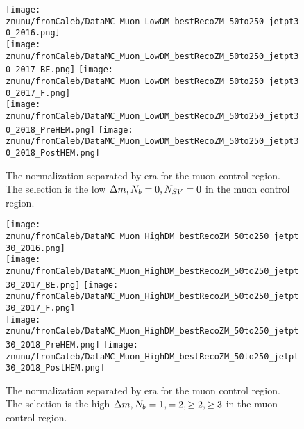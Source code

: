 \begin{figure}[!h]
	\begin{center}
    \texttt{[image: znunu/fromCaleb/DataMC\_Muon\_LowDM\_bestRecoZM\_50to250\_jetpt30\_2016.png]} \\
    \texttt{[image: znunu/fromCaleb/DataMC\_Muon\_LowDM\_bestRecoZM\_50to250\_jetpt30\_2017\_BE.png]} 
    \texttt{[image: znunu/fromCaleb/DataMC\_Muon\_LowDM\_bestRecoZM\_50to250\_jetpt30\_2017\_F.png]} \\
    \texttt{[image: znunu/fromCaleb/DataMC\_Muon\_LowDM\_bestRecoZM\_50to250\_jetpt30\_2018\_PreHEM.png]}
    \texttt{[image: znunu/fromCaleb/DataMC\_Muon\_LowDM\_bestRecoZM\_50to250\_jetpt30\_2018\_PostHEM.png]} \\
	\end{center}
	\caption[\Znunu{} Normalization in Low \dm{} for Muons]{The \Znunu{} normalization separated by era for the muon control region. The selection is the low $\Delta m, N_{b}=0, N_{SV}=0$ in the muon control region.
	 }
	\label{fig:znunu-norm-lm-muon}
\end{figure}

\begin{figure}[!h]
	\begin{center}
    \texttt{[image: znunu/fromCaleb/DataMC\_Muon\_HighDM\_bestRecoZM\_50to250\_jetpt30\_2016.png]} \\
    \texttt{[image: znunu/fromCaleb/DataMC\_Muon\_HighDM\_bestRecoZM\_50to250\_jetpt30\_2017\_BE.png]} 
    \texttt{[image: znunu/fromCaleb/DataMC\_Muon\_HighDM\_bestRecoZM\_50to250\_jetpt30\_2017\_F.png]} \\
    \texttt{[image: znunu/fromCaleb/DataMC\_Muon\_HighDM\_bestRecoZM\_50to250\_jetpt30\_2018\_PreHEM.png]}
    \texttt{[image: znunu/fromCaleb/DataMC\_Muon\_HighDM\_bestRecoZM\_50to250\_jetpt30\_2018\_PostHEM.png]} \\
	\end{center}
	\caption[\Znunu{} Normalization in High \dm{} for Muons]{The \Znunu{} normalization separated by era for the muon control region. The selection is the high $\Delta m, N_{b}=1, =2, \geq2,\geq3$ in the muon control region.
	 }
	\label{fig:znunu-norm-hm-muon}
\end{figure}

